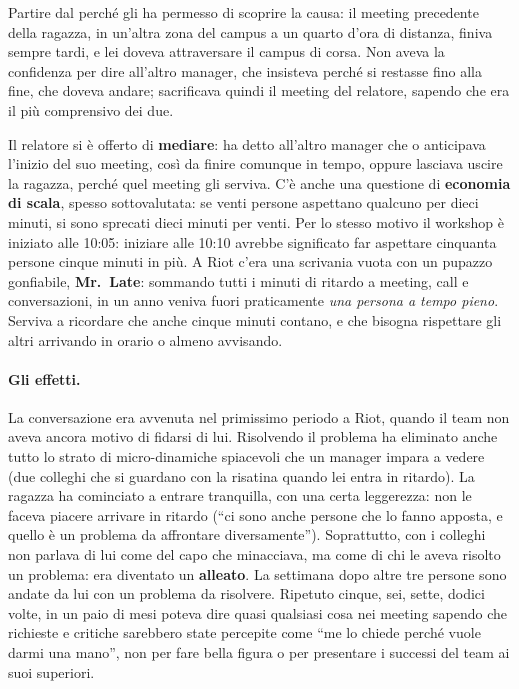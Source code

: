 Partire dal perché gli ha permesso di scoprire la causa: il meeting precedente
della ragazza, in un'altra zona del campus a un quarto d'ora di distanza,
finiva sempre tardi, e lei doveva attraversare il campus di corsa. Non aveva
la confidenza per dire all'altro manager, che insisteva perché si restasse
fino alla fine, che doveva andare; sacrificava quindi il meeting del relatore,
sapendo che era il più comprensivo dei due.

Il relatore si è offerto di \textbf{mediare}: ha detto all'altro manager che
o anticipava l'inizio del suo meeting, così da finire comunque in tempo,
oppure lasciava uscire la ragazza, perché quel meeting gli serviva. C'è anche
una questione di \textbf{economia di scala}, spesso sottovalutata: se venti
persone aspettano qualcuno per dieci minuti, si sono sprecati dieci minuti per
venti. Per lo stesso motivo il workshop è iniziato alle 10:05: iniziare alle
10:10 avrebbe significato far aspettare cinquanta persone cinque minuti in
più. A Riot c'era una scrivania vuota con un pupazzo gonfiabile, \textbf{Mr.\
Late}: sommando tutti i minuti di ritardo a meeting, call e conversazioni, in
un anno veniva fuori praticamente \emph{una persona a tempo pieno}. Serviva a
ricordare che anche cinque minuti contano, e che bisogna rispettare gli altri
arrivando in orario o almeno avvisando.

\paragraph{Gli effetti.} La conversazione era avvenuta nel primissimo periodo a
Riot, quando il team non aveva ancora motivo di fidarsi di lui. Risolvendo il
problema ha eliminato anche tutto lo strato di micro-dinamiche spiacevoli che
un manager impara a vedere (due colleghi che si guardano con la risatina
quando lei entra in ritardo). La ragazza ha cominciato a entrare tranquilla,
con una certa leggerezza: non le faceva piacere arrivare in ritardo (``ci sono
anche persone che lo fanno apposta, e quello è un problema da affrontare
diversamente''). Soprattutto, con i colleghi non parlava di lui come del capo
che minacciava, ma come di chi le aveva risolto un problema: era diventato
un \textbf{alleato}. La settimana dopo altre tre persone sono andate da lui
con un problema da risolvere. Ripetuto cinque, sei, sette, dodici volte, in un
paio di mesi poteva dire quasi qualsiasi cosa nei meeting sapendo che
richieste e critiche sarebbero state percepite come ``me lo chiede perché vuole
darmi una mano'', non per fare bella figura o per presentare i successi del
team ai suoi superiori.

